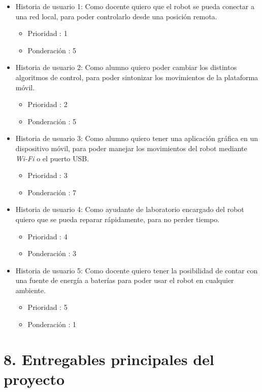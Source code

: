 \documentclass[
11pt, %
codirector, %
]{charter}
\begin{document}
\begin{itemize}
\item Historia de usuario 1: Como docente quiero que el robot se pueda conectar a una red local, para poder controlarlo desde una posición remota.
	\begin{itemize}
	\item Prioridad : 1
	\item Ponderación : 5
	\end{itemize}
\item Historia de usuario 2: Como alumno quiero poder cambiar los distintos algoritmos de control, para poder sintonizar los movimientos de la plataforma móvil. 
	\begin{itemize}
	\item Prioridad : 2
	\item Ponderación : 5
	\end{itemize}	
\item Historia de usuario 3:  Como alumno quiero tener una aplicación  gráfica en un dispositivo móvil, para poder manejar los movimientos del robot mediante \textit{Wi-Fi} o el puerto USB. 
	\begin{itemize}
	\item Prioridad : 3
	\item Ponderación : 7
	\end{itemize}
\item Historia de usuario 4: Como ayudante de laboratorio encargado del robot quiero que se pueda reparar rápidamente, para no perder tiempo. 
	\begin{itemize}
	\item Prioridad : 4
	\item Ponderación : 3
	\end{itemize}	
\item Historia de usuario 5: Como docente quiero tener la posibilidad de contar con una fuente de energía a baterías para poder usar el robot en cualquier ambiente.
	\begin{itemize}
	\item Prioridad : 5
	\item Ponderación : 1
	\end{itemize}		
\end{itemize}


\section{8. Entregables principales del proyecto}
\label{sec:entregables}
\end{document}
